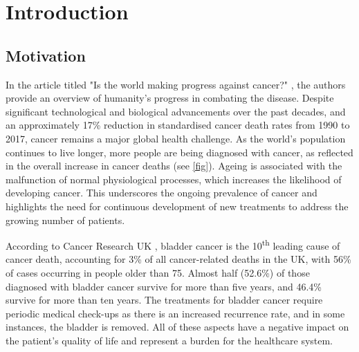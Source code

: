 
\chapter{Introduction}

\vspace{3mm}
\vspace{3mm}


\section{Motivation}


In the article titled "Is the world making progress against cancer?" \citep{Roser2015-qb}, the authors provide an overview of humanity's progress in combating the disease. Despite significant technological and biological advancements over the past decades, and an approximately 17\% reduction in standardised cancer death rates from 1990 to 2017, cancer remains a major global health challenge. As the world’s population continues to live longer, more people are being diagnosed with cancer, as reflected in the overall increase in cancer deaths (see \cref{fig}). Ageing is associated with the malfunction of normal physiological processes, which increases the likelihood of developing cancer. This underscores the ongoing prevalence of cancer and highlights the need for continuous development of new treatments to address the growing number of patients.


According to Cancer Research UK \citeyearpar{Cancer_Research_UK2015-cf}, bladder cancer is the 10\textsuperscript{th} leading cause of cancer death, accounting for 3\% of all cancer-related deaths in the UK, with 56\% of cases occurring in people older than 75. Almost half (52.6\%) of those diagnosed with bladder cancer survive for more than five years, and 46.4\% survive for more than ten years. The treatments for bladder cancer require periodic medical check-ups as there is an increased recurrence rate, and in some instances, the bladder is removed. All of these aspects have a negative impact on the patient's quality of life and represent a burden for the healthcare system.

